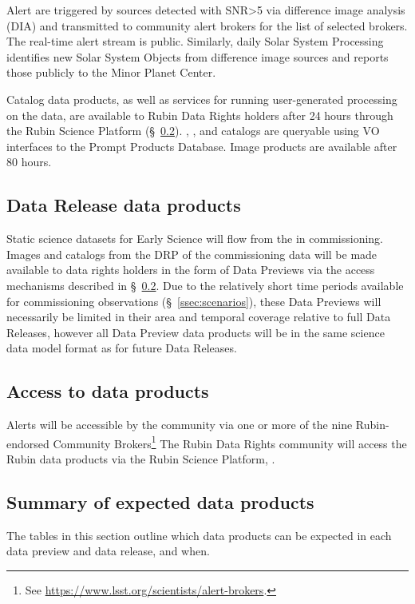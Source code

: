 Alert are triggered by sources detected with SNR>5 via difference image analysis (DIA) and transmitted to community alert brokers for the list of selected brokers.
The real-time alert stream is public. 
Similarly, daily Solar System Processing identifies new Solar System Objects from difference image sources and reports those publicly to the Minor Planet Center.

Catalog data products, as well as services for running user-generated processing on the data, are available to Rubin Data Rights holders after 24 hours through the Rubin Science Platform (\S~\ref{ssec:dataaccess}).
\DIASource, \DIAObject, and \SSObject catalogs are queryable using VO interfaces to the Prompt Products Database.
Image products are available after 80 hours.


\subsection{Data Release data products}
Static science datasets for Early Science will flow from the \svs in commissioning.
Images and catalogs from the DRP of the commissioning data will be made available to data rights holders in the form of Data Previews via the access mechanisms described in \S~\ref{ssec:dataaccess}.
Due to the relatively short time periods available for commissioning observations (\S~\ref{ssec:scenarios}), these Data Previews will necessarily be limited in their area and temporal coverage relative to full Data Releases, however all Data Preview data products will be in the same science data model format as for future Data Releases.

\subsection{Access to \es data products}\label{ssec:dataaccess}
Alerts will be accessible by the community via one or more of the nine Rubin-endorsed Community Brokers\footnote{See \url{https://www.lsst.org/scientists/alert-brokers}.}
The Rubin Data Rights community will access the Rubin data products via the Rubin Science Platform, \citep{LSE-319}.

\subsection{Summary of expected \es data products}

The tables in this section outline which data products can be expected in each \es data preview and data release, and when.

